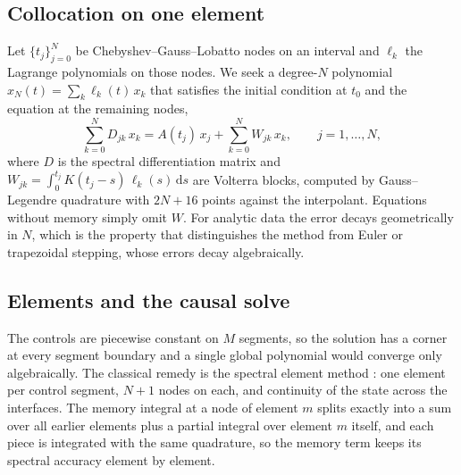 \documentclass[10pt]{article}
\newcommand{\dd}{\mathrm{d}}
\begin{document}
\subsection{Collocation on one element}

Let $\{t_j\}_{j=0}^N$ be Chebyshev--Gauss--Lobatto nodes on an interval and
$\ell_k$ the Lagrange polynomials on those nodes. We seek a degree-$N$
polynomial $x_N(t) = \sum_k \ell_k(t)\, x_k$ that satisfies the initial
condition at $t_0$ and the equation at the remaining nodes,
\begin{equation}
  \sum_{k=0}^N D_{jk}\, x_k = A(t_j)\, x_j + \sum_{k=0}^N W_{jk}\, x_k,
  \qquad j = 1,\dots,N,
  \label{eq:colloc}
\end{equation}
where $D$ is the spectral differentiation matrix and
$W_{jk} = \int_0^{t_j} K(t_j - s)\, \ell_k(s)\, \dd s$ are Volterra blocks,
computed by Gauss--Legendre quadrature with $2N + 16$ points against the
interpolant. Equations without memory simply omit $W$. For analytic data the
error decays geometrically in $N$, which is the property that distinguishes the
method from Euler or trapezoidal stepping, whose errors decay algebraically.

\subsection{Elements and the causal solve}

The controls are piecewise constant on $M$ segments, so the solution has a
corner at every segment boundary and a single global polynomial would converge
only algebraically. The classical remedy is the spectral element method
\cite{Patera1984}: one element per control segment, $N{+}1$ nodes on each, and
continuity of the state across the interfaces. The memory integral at a node of
element $m$ splits exactly into a sum over all earlier elements plus a partial
integral over element $m$ itself, and each piece is integrated with the same
quadrature, so the memory term keeps its spectral accuracy element by element.
\end{document}
